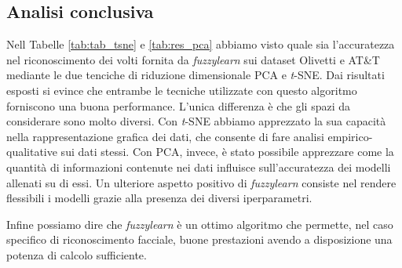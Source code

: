 \documentclass[12pt,italian]{report}
\begin{document}
\subsection{Analisi conclusiva}
Nell Tabelle \ref{tab:tab_tsne} e \ref{tab:res_pca} abbiamo visto quale sia l'accuratezza nel riconoscimento dei volti fornita da \emph{fuzzylearn} sui dataset Olivetti e AT\&T mediante le due tenciche di riduzione dimensionale PCA e \emph{t}-SNE. Dai risultati esposti si evince che entrambe le tecniche utilizzate con questo algoritmo forniscono una buona performance. L'unica differenza è che gli spazi da considerare sono molto diversi. Con \emph{t}-SNE abbiamo apprezzato la sua capacità nella rappresentazione grafica dei dati, che consente di fare analisi empirico-qualitative sui dati stessi. Con PCA, invece, è stato possibile apprezzare come la quantità di informazioni contenute nei dati influisce sull'accuratezza dei modelli allenati su di essi. Un ulteriore aspetto positivo di \emph{fuzzylearn} consiste nel rendere flessibili i modelli grazie alla presenza dei diversi iperparametri.

Infine possiamo dire che \emph{fuzzylearn} è un ottimo algoritmo che permette, nel caso specifico di riconoscimento facciale, buone prestazioni avendo a disposizione una potenza di calcolo sufficiente.
\end{document}
